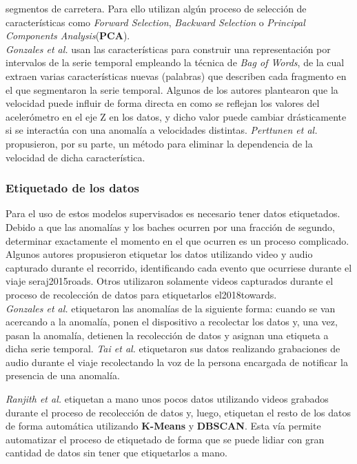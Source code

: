 			segmentos de carretera. Para ello utilizan algún proceso de selección de características como \emph{Forward Selection}, \emph{Backward Selection}
			o \emph{Principal Components Analysis}(\textbf{PCA}).\\
			\indent \emph{Gonzales et al.} usan las características para construir una representación por intervalos de la serie
			temporal empleando la técnica de \emph{Bag of Words}, de la cual extraen varias características nuevas (palabras) que describen cada fragmento
			en el que segmentaron la serie temporal. Algunos de los autores plantearon que la velocidad puede influir de forma directa en como se reflejan
			los valores del acelerómetro en el eje Z en los datos, y dicho valor puede cambiar drásticamente si se interactúa con una anomalía a velocidades
			distintas. \emph{Perttunen et al.}
			propusieron, por su parte, un método para eliminar la dependencia de la velocidad de dicha característica. 

		\subsubsection{Etiquetado de los datos}
			Para el uso de estos modelos supervisados es necesario tener datos etiquetados. Debido a que las anomalías y los baches ocurren por una 
			fracción de segundo, determinar exactamente el momento en el que ocurren es un proceso complicado. Algunos autores propusieron etiquetar
			los datos utilizando video y audio capturado durante el recorrido, identificando cada evento que ocurriese durante el viaje\brackcite
			{seraj2015roads}. Otros utilizaron solamente videos capturados durante el proceso de recolección de datos para etiquetarlos\brackcite
			{el2018towards}.\\
			\indent \emph{Gonzales et al.} etiquetaron las anomalías de la siguiente forma: cuando se van acercando a la
			anomalía, ponen el dispositivo a recolectar los datos y, una vez, pasan la anomalía, detienen la recolección de datos y asignan una etiqueta
			a dicha serie temporal. \emph{Tai et al.} etiquetaron sus datos realizando grabaciones de audio durante el
			viaje recolectando la voz de la persona encargada de notificar la presencia de una anomalía.

			\emph{Ranjith et al.} etiquetan a mano unos pocos datos utilizando videos grabados durante el proceso
			de recolección de datos y, luego, etiquetan el resto de los datos de forma automática utilizando \textbf{K-Means} y \textbf{DBSCAN}. Esta vía 
			permite automatizar el proceso de etiquetado de forma que se puede lidiar con gran cantidad de datos sin tener que etiquetarlos a mano.


